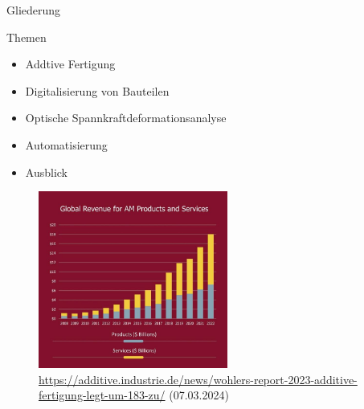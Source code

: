 \documentclass[../slides.tex]{subfiles}
\begin{document}
\begin{frame}{Gliederung}
  \begin{minipage}[]{.49\textwidth}
    \begin{block}{Themen}
      \begin{itemize}
          \item Addtive Fertigung
          \item Digitalisierung von Bauteilen
          \item Optische Spannkraftdeformationsanalyse
          \item Automatisierung 
          \item Ausblick
      \end{itemize}
    \end{block}
  \end{minipage}
  \hfill
  \begin{minipage}[]{.49\textwidth}
    \begin{figure}[]
      \includegraphics[height=165pt]{img_niklas/Picture3-1-scaled_0FB63A00-D319-40EF-A648-9739A68215D6.jpg}
      \caption{\tiny{\url{https://additive.industrie.de/news/wohlers-report-2023-additive-fertigung-legt-um-183-zu/} (07.03.2024)\\}}
      \label{fig:globalRev}
    \end{figure}
  \end{minipage}
\end{frame}
\end{document}
